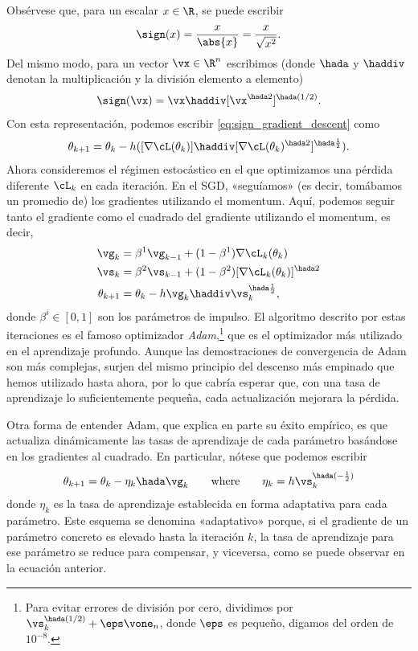 \documentclass[../../book-main_es.tex]{subfiles}
\begin{document}
Obsérvese que, para un escalar \(x \in \R\), se puede escribir
\begin{equation}
    \sign(x) = \frac{x}{\abs{x}} = \frac{x}{\sqrt{x^{2}}}.
\end{equation}
Del mismo modo, para un vector \(\vx \in \R^{n}\) escribimos (donde \(\hada\) y
\(\haddiv\) denotan la multiplicación y la división elemento a elemento)
\begin{equation}
    \sign(\vx) = \vx \haddiv [\vx^{\hada 2}]^{\hada (1/2)}.
\end{equation}
Con esta representación, podemos escribir \eqref{eq:sign_gradient_descent} como
\begin{equation}
    \theta_{k + 1} = \theta_{k} - h ([\nabla \cL(\theta_{k})] \haddiv [\nabla
    \cL(\theta_{k})^{\hada 2}]^{\hada \frac{1}{2}}).
\end{equation}
Ahora consideremos el régimen estocástico en el que optimizamos una
pérdida diferente \(\cL_{k}\) en cada iteración. En el SGD, «seguíamos»
(es decir, tomábamos un promedio de) los gradientes utilizando el momentum. Aquí, podemos
seguir tanto el gradiente como el cuadrado del gradiente utilizando el momentum, es decir,
\begin{align}
    \vg_{k}
    &= \beta^{1}\vg_{k - 1} + (1 - \beta^{1})\nabla \cL_{k}(\theta_{k}) \\
    \vs_{k}
    &= \beta^{2}\vs_{k - 1} + (1 - \beta^{2})[\nabla
    \cL_{k}(\theta_{k})]^{\hada 2}  \\
    \theta_{k + 1}
    &= \theta_{k} - h\vg_{k}\haddiv\vs_{k}^{\hada \frac{1}{2}},
\end{align}
donde \(\beta^{i} \in [0, 1]\) son los parámetros de impulso. El algoritmo
descrito por estas iteraciones es el famoso optimizador 
\textit{Adam},\footnote{Para evitar errores de división por cero, dividimos por
    \(\vs_{k}^{\hada (1/2)} + \eps \vone_{n}\), donde \(\eps\) es pequeño,
digamos del orden de \(10^{-8}\).} que es el optimizador más utilizado en
el aprendizaje profundo. Aunque las demostraciones de convergencia de Adam son más complejas,
surjen del mismo principio del descenso más empinado que hemos utilizado hasta ahora, por lo que
cabría esperar que, con una tasa de aprendizaje lo suficientemente pequeña, cada
actualización mejorara la pérdida.

Otra forma de entender Adam, que explica en parte su éxito empírico,
es que actualiza dinámicamente las tasas de aprendizaje de cada
parámetro basándose en los gradientes al cuadrado. En particular, nótese que
podemos escribir
\begin{equation}
    \theta_{k + 1} = \theta_{k} - \eta_{k} \hada \vg_{k} \qquad \text{where}
    \qquad \eta_{k} = h \vs_{k}^{\hada (-\frac{1}{2})}
\end{equation}
donde \(\eta_{k}\) es la tasa de aprendizaje establecida en forma adaptativa para cada parámetro.
Este esquema se denomina «adaptativo» porque, si el gradiente de un
parámetro concreto es elevado hasta la iteración \(k\), la
tasa de aprendizaje para ese parámetro se reduce para compensar, y
viceversa, como se puede observar en la ecuación anterior.
\end{document}
